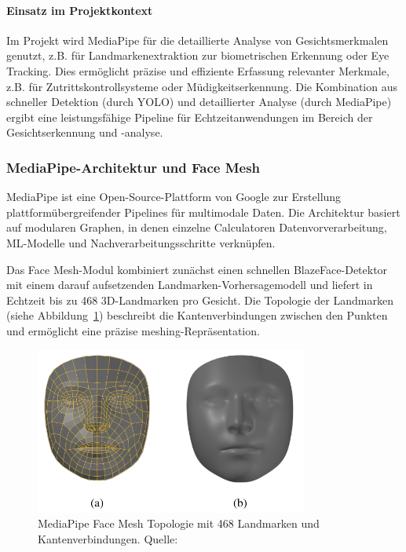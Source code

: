 \paragraph{Einsatz im Projektkontext}
Im Projekt wird MediaPipe für die detaillierte Analyse von Gesichtsmerkmalen genutzt, z.B. für Landmarkenextraktion zur biometrischen Erkennung oder Eye Tracking. Dies ermöglicht präzise und effiziente Erfassung relevanter Merkmale, z.B. für Zutrittskontrollsysteme oder Müdigkeitserkennung. Die Kombination aus schneller Detektion (durch YOLO) und detaillierter Analyse (durch MediaPipe) ergibt eine leistungsfähige Pipeline für Echtzeitanwendungen im Bereich der Gesichtserkennung und -analyse.

\subsubsection{MediaPipe-Architektur und Face Mesh}
MediaPipe ist eine Open-Source-Plattform von Google zur Erstellung plattformübergreifender Pipelines für multimodale Daten. Die Architektur basiert auf modularen Graphen, in denen einzelne Calculatoren Datenvorverarbeitung, ML-Modelle und Nachverarbeitungsschritte verknüpfen.

Das Face Mesh-Modul kombiniert zunächst einen schnellen BlazeFace-Detektor mit einem darauf aufsetzenden Landmarken-Vorhersagemodell und liefert in Echtzeit bis zu 468 3D-Landmarken pro Gesicht. Die Topologie der Landmarken (siehe Abbildung~\ref{fig:mesh_topology}) beschreibt die Kantenverbindungen zwischen den Punkten und ermöglicht eine präzise meshing-Repräsentation.

\begin{figure}[htbp]
    \centering
    \includegraphics[width=0.8\textwidth]{data/mesh_topology.png}
    \caption{MediaPipe Face Mesh Topologie mit 468 Landmarken und Kantenverbindungen. Quelle: \cite{mediapipe_mesh_topology}}
    \label{fig:mesh_topology}
\end{figure}

